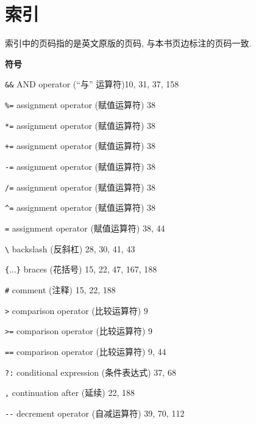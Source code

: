 \chapter{索引}
\label{chap:index}

索引中的页码指的是英文原版的页码, 与本书页边标注的页码一致.

\begin{multicols}{2}

\setlength\parindent{0pt}
\small

\medskip\textbf{\large{符号}}

\hangindent=2pc  \verb'&&' AND operator (``与'' 运算符)10, 31, 37, 158

\hangindent=2pc  \verb'%=' assignment operator (赋值运算符) 38

\hangindent=2pc  \verb'*=' assignment operator (赋值运算符) 38

\hangindent=2pc  \verb'+=' assignment operator (赋值运算符) 38

\hangindent=2pc  \verb'-=' assignment operator (赋值运算符) 38

\hangindent=2pc  \verb'/=' assignment operator (赋值运算符) 38

\hangindent=2pc  \verb'^=' assignment operator (赋值运算符) 38

\hangindent=2pc  \verb'=' assignment operator (赋值运算符) 38, 44

\hangindent=2pc  \verb'\' backslash (反斜杠) 28, 30, 41, 43

\hangindent=2pc  \verb'{'...\verb'}' braces (花括号) 15, 22, 47, 167, 188

\hangindent=2pc  \verb'#' comment (注释) 15, 22, 188

\hangindent=2pc  \verb'>' comparison operator (比较运算符) 9

\hangindent=2pc  \verb'>=' comparison operator (比较运算符) 9

\hangindent=2pc  \verb'==' comparison operator (比较运算符) 9, 44

\hangindent=2pc  \verb'?:' conditional expression (条件表达式) 37, 68

\hangindent=2pc  \verb',' continuation after (延续) 22, 188

\hangindent=2pc  \verb'--' decrement operator (自减运算符) 39, 70, 112


\end{multicols}
